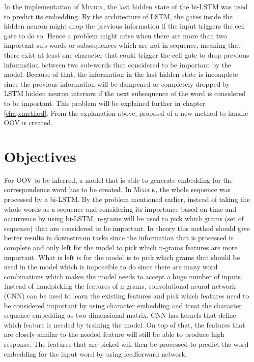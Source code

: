     In the implementation of \textsc{Mimick}, the last hidden state of
    the bi-LSTM was used to predict its embedding. By the architecture of
    LSTM, the gates inside the hidden neuron might drop the previous
    information if the input triggers the cell gate to do so. Hence a
    problem might arise when there are more than two important
    sub-words or subsequences which are not in sequence, meaning
    that there exist at least one character that could trigger the
    cell gate to drop previous information between two sub-words that
    considered to be important by the model. Because of that, the
    information in the last hidden state is incomplete since the
    previous information will be dampened or completely dropped by
    LSTM hidden neuron interiors if the next subsequence of the word
    is considered to be important. This problem will be explained
    further in chapter \ref{chap:method}. From the explanation above,
    proposal of a new method to handle OOV is created.

\section{Objectives}
    For OOV to be inferred, a model that is able to generate embedding
    for the correspondence word has to be created. In \textsc{Mimick},
    the whole sequence was processed by a bi-LSTM. By the problem
    mentioned earlier, instead of taking the whole words as a sequence
    and considering its importance based on time and occurrence by
    using bi-LSTM, n-grams will be used to pick which grams (set of
    sequence) that are considered to be important. In theory this
    method should give better results in downstream tasks since the
    information that is processed is complete and only left for the
    model to pick which n-grams features are more important. What is
    left is for the model is to pick which grams that should be used
    in the model which is impossible to do since there are many word
    combinations which makes the model needs to accept a huge number
    of inputs. Instead of handpicking the features of n-grams,
    convolutional neural network (CNN) can be used to learn the
    existing features and pick which features need to be considered
    important by using character embedding and treat the character
    sequence embedding as two-dimensional matrix. CNN has kernels that
    define which feature is needed by training the model. On top of
    that, the features that are closely similar to the needed feature
    will still be able to produce high response. The features that are picked
    will then be processed to predict the word embedding for the input
    word by using feedforward network.

